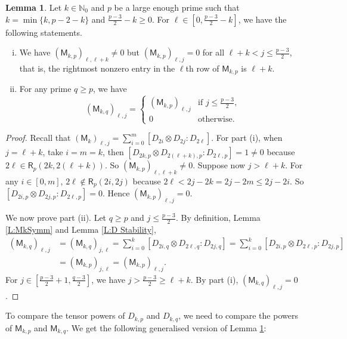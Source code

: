 \documentclass[12pt,reqno]{amsart}
\newcommand{\NN}{\mathbb{N}}
\newcommand{\Rect}{\mathsf{R}}
\renewcommand{\geq}{\geqslant}
\renewcommand{\leq}{\leqslant}
\newcommand{\M}{\mathsf{M}}
\theoremstyle{definition}
\newtheorem{lem}[thm]{Lemma}
\numberwithin{equation}{section}
\begin{document}
\begin{lem}\label{L:MpMqn=1}
  Let $k\in\NN_0$ and $p$ be a large enough prime such that $k=\min\{k,p-2-k\}$ and $\frac{p-3}{2}-k\geq 0$. For $\ell\in [0,\frac{p-3}{2}-k]$, we have the following statements. 
  \begin{enumerate}[(i)]
    \item We have $(\M_{k,p})_{\ell,\ell+k}\neq 0$ but $(\M_{k,p})_{\ell,j}= 0$ for all $\ell+k<j\leq \frac{p-3}{2}$, that is, the rightmost nonzero entry in the $\ell$th row of $\M_{k,p}$ is $\ell+k$. 
    \item For any prime $q\geq p$, we have \[(\M_{k,q})_{\ell,j}=\left \{\begin{array}{ll} (\M_{k,p})_{\ell,j}& \text{if $j\leq \frac{p-3}{2}$,}\\ 0&\text{otherwise.}\end{array}\right .\]
  \end{enumerate}
\end{lem}
\begin{proof}
  Recall that $(\M_k)_{\ell,j}=\sum_{i=0}^m[D_{2i}\otimes D_{2j}:D_{2\ell}]$. For part (i), when $j=\ell+k$, take $i=m=k$, then $[D_{2k,p}\otimes D_{2(\ell+k),p}:D_{2\ell,p}]=1\neq 0$ because $2\ell\in \Rect_p(2k,2(\ell+k))$. So $(\M_{k,p})_{\ell,\ell+k}\neq 0$. Suppose now $j>\ell+k$. For any $i\in [0,m]$, $2\ell\not\in \Rect_p(2i,2j)$ because $2\ell<2j-2k=2j-2m\leq 2j-2i$. So $[D_{2i,p}\otimes D_{2j,p}:D_{2\ell,p}]=0$. Hence $(\M_{k,p})_{\ell,j}=0$.
  
  We now prove part (ii). Let $q \geq p$ and $j \leq \frac{p-3}{2}$. By definition, Lemma \ref{L:MkSymm} and Lemma \ref{L:D Stability},
  \begin{align*}
  	(\M_{k,q})_{\ell,j} &= (\M_{k,q})_{j,\ell}= \sum_{i=0}^k [D_{2i,q}\otimes D_{2\ell,q}:D_{2j,q}]  = \sum_{i=0}^k [D_{2i,p}\otimes D_{2\ell,p}:D_{2j,p}]\\
   &= (\M_{k,p})_{j,\ell} = (\M_{k,p})_{\ell,j}. \end{align*}
  For $j \in [\frac{p-3}{2}+1, \frac{q-3}{2}]$, we have $j > \frac{p-3}{2} \geq \ell+k$. By part (i), $(\M_{k,q})_{\ell,j}=0$.
\end{proof}

To compare the tensor powers of $D_{k,p}$ and $D_{k,q}$, we need to compare the powers of $\M_{k,p}$ and $\M_{k,q}$. We get the following generalised version of Lemma \ref{L:MpMqn=1}:
\end{document}

